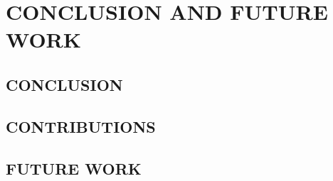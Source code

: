 \chapter{CONCLUSION AND FUTURE WORK}

\section{CONCLUSION}

\section{CONTRIBUTIONS}

\section{FUTURE WORK}
